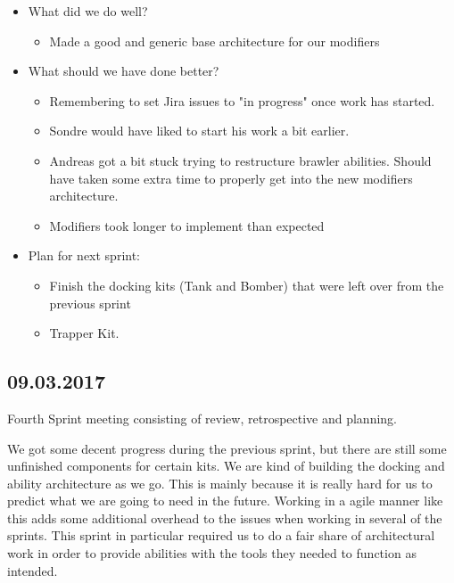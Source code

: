 \begin{itemize}
    \item What did we do well?
    \begin{itemize}
        \item Made a good and generic base architecture for our modifiers
    \end{itemize}
    
    \item What should we have done better?
    \begin{itemize}
        \item Remembering to set Jira issues to "in progress" once work has started.
        \item Sondre would have liked to start his work a bit earlier.
        \item Andreas got a bit stuck trying to restructure brawler abilities. Should have taken some extra time to properly get into the new modifiers architecture.
        \item Modifiers took longer to implement than expected
    \end{itemize}
    
    \item Plan for next sprint:
    \begin{itemize}
        \item Finish the docking kits (Tank and Bomber) that were left over from the previous sprint
        \item Trapper Kit.
    \end{itemize}
\end{itemize}

\subsection*{09.03.2017}
Fourth Sprint meeting consisting of review, retrospective and planning.

We got some decent progress during the previous sprint, but there are still some unfinished components for certain kits. We are kind of building the docking and ability architecture as we go. 
This is mainly because it is really hard for us to predict what we are going to need in the future. Working in a agile manner like this adds some additional overhead to the issues when working in several of the sprints. This sprint in particular required us to do a fair share of architectural work in order to provide abilities with the tools they needed to function as intended. 

